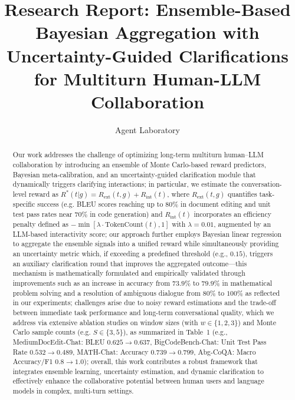 \documentclass{article}
\title{Research Report: Ensemble-Based Bayesian Aggregation with Uncertainty-Guided Clarifications for Multiturn Human-LLM Collaboration}
\author{Agent Laboratory}
\date{}
\begin{document}
\maketitle

\begin{abstract}
Our work addresses the challenge of optimizing long-term multiturn human–LLM collaboration by introducing an ensemble of Monte Carlo-based reward predictors, Bayesian meta-calibration, and an uncertainty-guided clarification module that dynamically triggers clarifying interactions; in particular, we estimate the conversation-level reward as \(R^*(t|g) = R_{\text{ext}}(t,g) + R_{\text{int}}(t)\), where \(R_{\text{ext}}(t,g)\) quantifies task-specific success (e.g. BLEU scores reaching up to \(80\%\) in document editing and unit test pass rates near \(70\%\) in code generation) and \(R_{\text{int}}(t)\) incorporates an efficiency penalty defined as \(-\min[\lambda \cdot \text{TokenCount}(t), 1]\) with \(\lambda=0.01\), augmented by an LLM-based interactivity score; our approach further employs Bayesian linear regression to aggregate the ensemble signals into a unified reward while simultaneously providing an uncertainty metric which, if exceeding a predefined threshold (e.g., \(0.15\)), triggers an auxiliary clarification round that improves the aggregated outcome—this mechanism is mathematically formulated and empirically validated through improvements such as an increase in accuracy from \(73.9\%\) to \(79.9\%\) in mathematical problem solving and a resolution of ambiguous dialogue from \(80\%\) to \(100\%\) as reflected in our experiments; challenges arise due to noisy reward estimations and the trade-off between immediate task performance and long-term conversational quality, which we address via extensive ablation studies on window sizes (with \(w \in \{1,2,3\}\)) and Monte Carlo sample counts (e.g. \(S \in \{3,5\}\)), as summarized in Table~1 (e.g., MediumDocEdit-Chat: BLEU \(0.625 \rightarrow 0.637\), BigCodeBench-Chat: Unit Test Pass Rate \(0.532 \rightarrow 0.489\), MATH-Chat: Accuracy \(0.739 \rightarrow 0.799\), Abg-CoQA: Macro Accuracy/F1 \(0.8 \rightarrow 1.0\)); overall, this work contributes a robust framework that integrates ensemble learning, uncertainty estimation, and dynamic clarification to effectively enhance the collaborative potential between human users and language models in complex, multi-turn settings.
\end{abstract}
\end{document}
